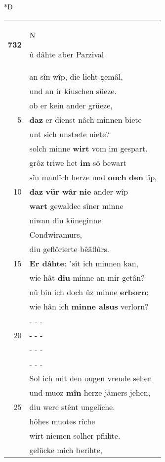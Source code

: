 \documentclass[8pt,a4paper,notitlepage]{article}
\begin{document}
\begin{table}[ht]
\begin{minipage}[t]{0.5\linewidth}
\small
\begin{center}*D
\end{center}
\begin{tabular}{rl}
\textbf{732} & \begin{large}N\end{large}û dâhte aber Parzival\\ 
 & an sîn wîp, die lieht gemâl,\\ 
 & und an ir kiuschen süeze.\\ 
 & ob er kein ander grüeze,\\ 
5 & \textbf{daz} er dienst nâch minnen biete\\ 
 & unt sich unstæte niete?\\ 
 & solch minne \textbf{wirt} vom im gespart.\\ 
 & grôz triwe het \textbf{im} sô bewart\\ 
 & sîn manlîch herze und \textbf{ouch} \textbf{den} lîp,\\ 
10 & \textbf{daz} \textbf{vür wâr} \textbf{nie} ander wîp\\ 
 & \textbf{wart} gewaldec sîner minne\\ 
 & niwan diu küneginne\\ 
 & Condwiramurs,\\ 
 & diu geflôrierte bêâflûrs.\\ 
15 & \textbf{Er dâhte}: "sît ich minnen kan,\\ 
 & wie hât \textbf{diu} minne an mir getân?\\ 
 & nû bin ich doch ûz minne \textbf{erborn}:\\ 
 & wie hân ich \textbf{minne alsus} verlorn?\\ 
 & \multicolumn{1}{l}{ - - - }\\ 
20 & \multicolumn{1}{l}{ - - - }\\ 
 & \multicolumn{1}{l}{ - - - }\\ 
 & \multicolumn{1}{l}{ - - - }\\ 
 & Sol ich mit den ougen vreude sehen\\ 
 & und muoz \textbf{mîn} herze jâmers jehen,\\ 
25 & diu werc stênt ungelîche.\\ 
 & hôhes muotes rîche\\ 
 & wirt niemen solher pflihte.\\ 
 & gelücke mich berihte,\\ 

\end{tabular}
\end{minipage}
\end{table}
\end{document}
